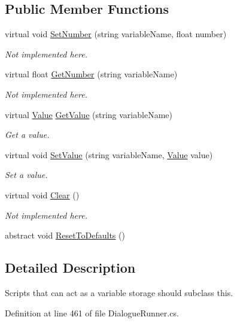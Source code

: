 \subsection*{Public Member Functions}
\begin{DoxyCompactItemize}
\item 
virtual void \hyperlink{a00181_ac0d2f2e081944ad197992a26ad1a833c}{Set\-Number} (string variable\-Name, float number)
\begin{DoxyCompactList}\small\item\em Not implemented here. \end{DoxyCompactList}\item 
virtual float \hyperlink{a00181_add85a45dd65a5d4bd41c9d5ce5f77d19}{Get\-Number} (string variable\-Name)
\begin{DoxyCompactList}\small\item\em Not implemented here. \end{DoxyCompactList}\item 
virtual \hyperlink{a00177}{Value} \hyperlink{a00181_ac6ebafcbebc2b2d71eba8562490a2f1e}{Get\-Value} (string variable\-Name)
\begin{DoxyCompactList}\small\item\em Get a value. \end{DoxyCompactList}\item 
virtual void \hyperlink{a00181_a25f979b062d63c9e886fe7070ce4561b}{Set\-Value} (string variable\-Name, \hyperlink{a00177}{Value} value)
\begin{DoxyCompactList}\small\item\em Set a value. \end{DoxyCompactList}\item 
virtual void \hyperlink{a00181_a587fe10b367ace190e10f3bcb590a53c}{Clear} ()
\begin{DoxyCompactList}\small\item\em Not implemented here. \end{DoxyCompactList}\item 
abstract void \hyperlink{a00181_a33fcbff56561e53e0a70b59c56f0c3af}{Reset\-To\-Defaults} ()
\end{DoxyCompactItemize}


\subsection{Detailed Description}
Scripts that can act as a variable storage should subclass this. 

Definition at line 461 of file Dialogue\-Runner.\-cs.



